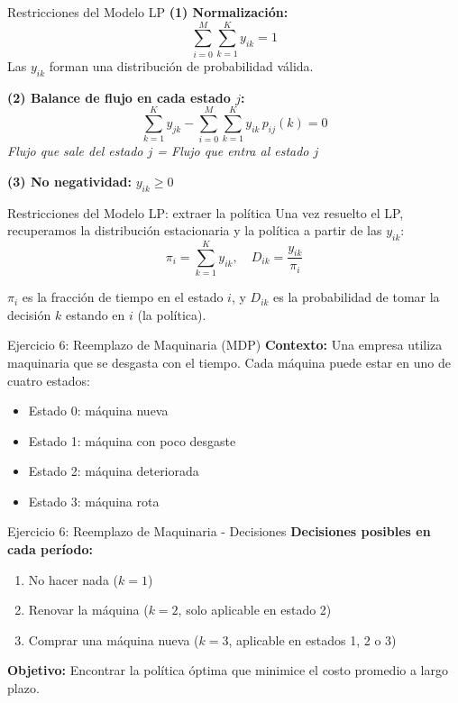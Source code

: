 \documentclass{beamer}
\begin{document}
\begin{frame}{Restricciones del Modelo LP}
    \small
    \textbf{(1) Normalización:}
    \[\sum_{i=0}^M \sum_{k=1}^K y_{ik} = 1\]
    Las $y_{ik}$ forman una distribución de probabilidad válida.

    \vspace{0.5em}

    \textbf{(2) Balance de flujo en cada estado $j$:}
    \[\sum_{k=1}^K y_{jk} - \sum_{i=0}^M \sum_{k=1}^K y_{ik}\,p_{ij}(k) = 0\]
    \textit{Flujo que sale del estado $j$ = Flujo que entra al estado $j$}

    \vspace{0.5em}

    \textbf{(3) No negatividad:} $y_{ik} \ge 0$
\end{frame}

\begin{frame}{Restricciones del Modelo LP: extraer la política}
    \small
    Una vez resuelto el LP, recuperamos la distribución estacionaria y la política a partir de las $y_{ik}$:
    \[
    \pi_i = \sum_{k=1}^K y_{ik}, \quad D_{ik} = \frac{y_{ik}}{\pi_i}
    \]

    \vspace{0.5em}

    $\pi_i$ es la fracción de tiempo en el estado $i$, y $D_{ik}$ es la probabilidad de tomar la decisión $k$ estando en $i$ (la política).
\end{frame}

\begin{frame}{Ejercicio 6: Reemplazo de Maquinaria (MDP)}
    \small
    \textbf{Contexto:} Una empresa utiliza maquinaria que se desgasta con el tiempo. Cada máquina puede estar en uno de cuatro estados:

    \vspace{0.5em}

    \begin{itemize}
        \item Estado 0: máquina nueva
        \item Estado 1: máquina con poco desgaste
        \item Estado 2: máquina deteriorada
        \item Estado 3: máquina rota
    \end{itemize}
\end{frame}

\begin{frame}{Ejercicio 6: Reemplazo de Maquinaria - Decisiones}
    \small
    \textbf{Decisiones posibles en cada período:}
    \begin{enumerate}
        \item No hacer nada ($k=1$)
        \item Renovar la máquina ($k=2$, solo aplicable en estado 2)
        \item Comprar una máquina nueva ($k=3$, aplicable en estados 1, 2 o 3)
    \end{enumerate}

    \vspace{1em}

    \textbf{Objetivo:} Encontrar la política óptima que minimice el costo promedio a largo plazo.
\end{frame}
\end{document}
